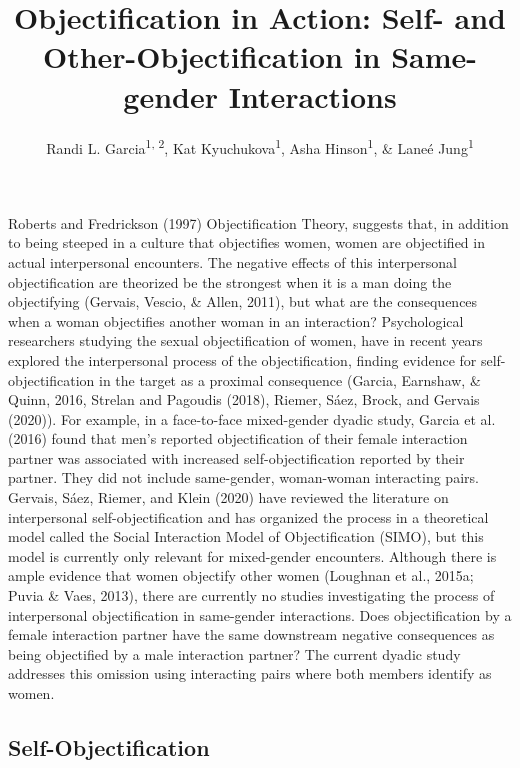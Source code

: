 \documentclass[man]{apa6}
\title{Objectification in Action: Self- and Other-Objectification in
Same-gender Interactions}
\author{Randi L. Garcia\textsuperscript{1, 2}, Kat
Kyuchukova\textsuperscript{1}, Asha Hinson\textsuperscript{1}, \& Laneé
Jung\textsuperscript{1}}
\date{}
\affiliation{
\vspace{0.5cm}
\textsuperscript{1} Department of Psychology, Smith College\\\textsuperscript{2} Program in Statistical and Data Sciences, Smith College}
\begin{document}
\maketitle

Roberts and Fredrickson (1997) Objectification Theory, suggests that, in
addition to being steeped in a culture that objectifies women, women are
objectified in actual interpersonal encounters. The negative effects of
this interpersonal objectification are theorized be the strongest when
it is a man doing the objectifying (Gervais, Vescio, \& Allen, 2011),
but what are the consequences when a woman objectifies another woman in
an interaction? Psychological researchers studying the sexual
objectification of women, have in recent years explored the
interpersonal process of the objectification, finding evidence for
self-objectification in the target as a proximal consequence (Garcia,
Earnshaw, \& Quinn, 2016, Strelan and Pagoudis (2018), Riemer, Sáez,
Brock, and Gervais (2020)). For example, in a face-to-face mixed-gender
dyadic study, Garcia et al. (2016) found that men's reported
objectification of their female interaction partner was associated with
increased self-objectification reported by their partner. They did not
include same-gender, woman-woman interacting pairs. Gervais, Sáez,
Riemer, and Klein (2020) have reviewed the literature on interpersonal
self-objectification and has organized the process in a theoretical
model called the Social Interaction Model of Objectification (SIMO), but
this model is currently only relevant for mixed-gender encounters.
Although there is ample evidence that women objectify other women
(Loughnan et al., 2015a; Puvia \& Vaes, 2013), there are currently no
studies investigating the process of interpersonal objectification in
same-gender interactions. Does objectification by a female interaction
partner have the same downstream negative consequences as being
objectified by a male interaction partner? The current dyadic study
addresses this omission using interacting pairs where both members
identify as women.

\subsection{Self-Objectification}\label{self-objectification}
\end{document}
